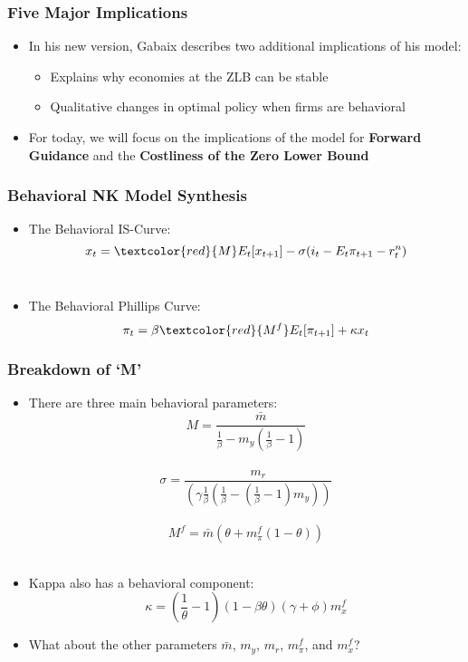 \documentclass{beamer}
\begin{document}
\begin{frame}
	\frametitle{Five Major Implications}
	\begin{itemize}
		\item In his new version, Gabaix describes two additional implications of his model:
		\vspace{8pt}
		\begin{itemize}
			\item Explains why economies at the ZLB can be stable
			\item Qualitative changes in optimal policy when firms are behavioral
		\end{itemize}
		\vspace{8pt}
		\item For today, we will focus on the implications of the model for \textbf{Forward Guidance} and the \textbf{Costliness of the Zero Lower Bound}
	\end{itemize}
\end{frame}


\begin{frame}
	\frametitle{Behavioral NK Model Synthesis}
	\begin{itemize}
		\item The Behavioral IS-Curve: $$x_{t}=\textcolor{red}{M}E_{t}[x_{t+1}]-\sigma(i_{t}-E_{t}\pi_{t+1}-r_{t}^{n})$$\\
		\vspace{5pt}
		\item The Behavioral Phillips Curve: $$\pi_{t}=\beta \textcolor{red}{M^{f}}E_{t}[\pi_{t+1}]+\kappa x_{t}$$
	\end{itemize}
\end{frame}


\begin{frame}
	\frametitle{Breakdown of `M'}
	\begin{itemize}
		\item There are three main behavioral parameters:\\ 
		$$M=\frac{\bar{m}}{\frac{1}{\beta}-m_{y}(\frac{1}{\beta}-1)}$$\\
		$$\sigma=\frac{m_{r}}{(\gamma\frac{1}{\beta}(\frac{1}{\beta}-(\frac{1}{\beta}-1)m_{y}))}$$\\
		$$M^{f}=\bar{m}(\theta+m^{f}_{\pi}(1-\theta))$$\\
		\vspace{5pt}
		\item Kappa also has a behavioral component:\\ $$\kappa=(\frac{1}{\theta}-1)(1-\beta\theta)(\gamma+\phi)m^{f}_{x}$$
		\item What about the other parameters $\bar{m}$, $m_{y}$, $m_{r}$, $m^{f}_{\pi}$, and $m^{f}_{x}$?\\ 	
	\end{itemize}
\end{frame}
\end{document}
